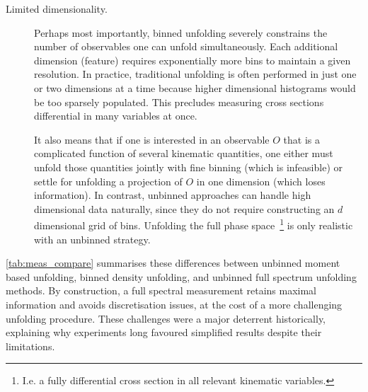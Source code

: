 \begin{description}
        \item[Limited dimensionality.]
            Perhaps most importantly, binned unfolding severely constrains the number of observables one can unfold simultaneously.
            Each additional dimension (feature) requires exponentially more bins to maintain a given resolution.
            In practice, traditional unfolding is often performed in just one or two dimensions at a time because higher dimensional histograms would be too sparsely populated.
            This precludes measuring cross sections differential in many variables at once.
            
            It also means that if one is interested in an observable $O$ that is a complicated function of several kinematic quantities, one either must unfold those quantities jointly with fine binning (which is infeasible) or settle for unfolding a projection of $O$ in one dimension (which loses information).
            In contrast, unbinned approaches can handle high dimensional data naturally, since they do not require constructing an \(d\) dimensional grid of bins.
            Unfolding the full phase space~\footnote{I.e. a fully differential cross section in all relevant kinematic variables.} is only realistic with an unbinned strategy.
    \end{description}        



    \cref{tab:meas_compare} summarises these differences between unbinned moment based unfolding, binned density unfolding, and unbinned full spectrum unfolding methods.
    By construction, a full spectral measurement retains maximal information and avoids discretisation issues, at the cost of a more challenging unfolding procedure.
    These challenges were a major deterrent historically, explaining why experiments long favoured simplified results despite their limitations.
    
